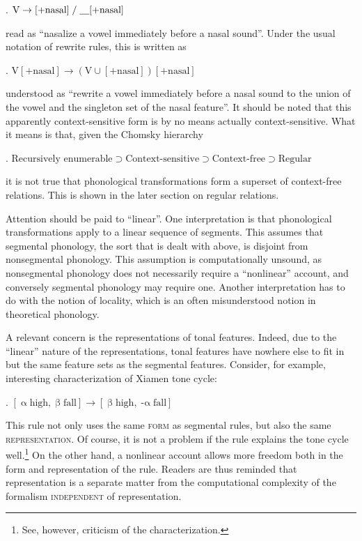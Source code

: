 \documentclass[12pt, a4paper]{report}
\newcommand{\context}{\mathrel{/}}
\newcommand{\gap}{\underline{\hspace{1em}}}
\newcommand{\textemph}[1]{\textsc{#1}}
\begin{document}
\ex. \(\text{V} \to [+\text{nasal}]
\context \text{\gap}[+\text{nasal}]\)

read as \enquote{nasalize a vowel immediately before a nasal sound}.
Under the usual notation of rewrite rules, this is written as

\ex. \(\text{V}[+\text{nasal}] \to
(\text{V} \cup [+\text{nasal}])[+\text{nasal}]\)

understood as \enquote{rewrite a vowel immediately before a nasal
  sound to the union of the vowel and the singleton set of the nasal
  feature}.  It should be noted that this apparently context-sensitive
form is by no means actually context-sensitive.  What it means is
that, given the Chomsky hierarchy \parencite{c59cfpg}

\ex. \(\text{Recursively enumerable} \supset
\text{Context-sensitive} \supset
\text{Context-free} \supset
\text{Regular}\)

it is not true that phonological transformations form a superset of
context-free relations.  This is shown in the later section on regular
relations.

Attention should be paid to \enquote{linear}.  One interpretation is
that phonological transformations apply to a linear sequence of
segments.  This assumes that segmental phonology, the sort that is
dealt with above, is disjoint from nonsegmental phonology.  This
assumption is computationally unsound, as nonsegmental phonology does
not necessarily require a \enquote{nonlinear} account, and conversely
segmental phonology may require one.  Another interpretation has to do
with the notion of locality, which is an often misunderstood notion in
theoretical phonology.

A relevant concern is the representations of tonal features.  Indeed,
due to the \enquote{linear} nature of the representations, tonal
features have nowhere else to fit in but the same feature sets as the
segmental features.  Consider, for example, 
interesting characterization of Xiamen tone cycle:

\ex. \([\mathop{\alpha}\text{high}, \mathop{\beta}\text{fall}]
\to [\mathop{\beta}\text{high}, \mathop{-\alpha}\text{fall}]\)

This rule not only uses the same \textemph{form} as segmental rules,
but also the same \textemph{representation}.  Of course, it is not a
problem if the rule explains the tone cycle well.\footnote{See,
  however,  criticism of the characterization.}  On
the other hand, a nonlinear account allows more freedom both in the
form and representation of the rule.  Readers are thus reminded that
representation is a separate matter from the computational complexity
of the formalism \textemph{independent} of representation.
\end{document}
